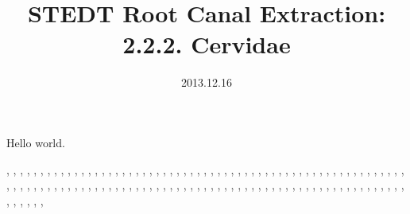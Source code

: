 \documentclass[11pt,twoside,twocolumn]{book}
\title{STEDT Root Canal Extraction:\\2.2.2. Cervidae}
\author{}
\date{2013.12.16}
\begin{document}
Hello world.

\citealt{AAAM-SSM}, 
\citealt{ABR1985}, 
\citealt{ACH1975}, 
\citealt{ACK-DTE}, 
\citealt{ACK-GTL}, 
\citealt{ACST}, 
\citealt{AH-CSDPN}, 
\citealt{AH-TND}, 
\citealt{AJ-BED}, 
\citealt{AM-NaLaze1}, 
\citealt{Anony1959}, 
\citealt{AO-diss}, 
\citealt{AP-Pwo}, 
\citealt{ARC-GMA}, 
\citealt{ARO1980}, 
\citealt{AS-ABCOC}, 
\citealt{AT-MPB}, 
\citealt{AT-Padam}, 
\citealt{AW-CLGD}, 
\citealt{AW-TBT}, 
\citealt{B-ShrpaHQ}, 
\citealt{BAI1909}, 
\citealt{BAI1911}, 
\citealt{BB-Belhare}, 
\citealt{BBL-TL}, 
\citealt{BDHH1971}, 
\citealt{BER1965}, 
\citealt{Bhat-Boro}, 
\citealt{Bhat-TNL}, 
\citealt{Bhat-TNV}, 
\citealt{BK-AD}, 
\citealt{BLBC-Khonom}, 
\citealt{BM-Bah}, 
\citealt{BM-Bbp}, 
\citealt{BM-Hay}, 
\citealt{BM-Hbp}, 
\citealt{BM-Htvm}, 
\citealt{BM-LH}, 
\citealt{BM-Lim}, 
\citealt{BM-PK7}, 
\citealt{BM-PTNL}, 
\citealt{BMMM-Bbp}, 
\citealt{BON1930-31}, 
\citealt{BOR-Sema}, 
\citealt{BOR1938}, 
\citealt{BP-PPWL}, 
\citealt{BRO1837}, 
\citealt{BRO1920}, 
\citealt{BRO1951}, 
\citealt{BRTMCM}, 
\citealt{BS1971b}, 
\citealt{BS1971c}, 
\citealt{BSCH1971a}, 
\citealt{BSCH1971c}, 
\citealt{BSTL}, 
\citealt{BUT1875}, 
\citealt{CAU1969}, 
\citealt{CB-SpitiQ}, 
\citealt{CG-Diss}, 
\citealt{CG-Dolak}, 
\citealt{CG-Kath}, 
\citealt{CG-NewariQ2}, 
\citealt{CG-NewariQ3}, 
\citealt{CHE1990}, 
\citealt{CHU1867}, 
\citealt{CK-CS}, 
\citealt{CK-pGd}, 
\citealt{CK-TujBQ}, 
\citealt{CK-TujMQ}, 
\citealt{CK-YiQ}, 
\citealt{CLA1911}, 
\citealt{COO}, 
\citealt{CSL-YIzd}, 
\citealt{CYS-Meithei}, 
\citealt{DAP-Chm}, 
\citealt{DAS-TED}, 
\citealt{DB-Bisu}, 
\citealt{DB-Lahu}, 
\citealt{DB-Lisu}, 
\citealt{DB-Ph}, 
\citealt{DB-Phunoi}, 
\citealt{DB-PLolo}, 
\citealt{DB-Ugong}, 
\citealt{DBS-PaO}, 
\citealt{DC-Kucong}, 
\citealt{Dell-Bai}, 
\citealt{Deuri}, 
\citealt{DHFRL}, 
\citealt{DHR-IBWS}, 
\citealt{DK-Moyon}, 
\citealt{DLF-Gazhuo}, 
\citealt{DM-BoroQan}, 
\citealt{DM-BoroQno}, 
\citealt{DM-GaroQan}, 
\citealt{DM-GaroQno}, 
\citealt{DM-KQan}, 
\citealt{DM-KQno}, 
\citealt{DM-TKQan}, 
\citealt{DM-TKQno}, 
\citealt{DNW-Gloss}, 
\citealt{DNW-KhamQ}, 
\citealt{DQ-AL}, 
\citealt{DQ-Amdo}, 
\citealt{DQ-Bai}, 
\citealt{DQ-Batang}, 
\citealt{DQ-Bola}, 
\citealt{DQ-Dafang}, 
\citealt{DQ-Daofu}, 
\citealt{DQ-Gazhuo}, 
\citealt{DQ-Hani}, 
\citealt{DQ-Haoni}, 
\citealt{DQ-Jiarong}, 
\citealt{DQ-JinA}, 
\citealt{DQ-JinB}, 
\citealt{DQ-Jingpho}, 
\citealt{DQ-KarenA}, 
\citealt{DQ-KarenB}, 
\citealt{DQ-Langsu}, 
\citealt{DQ-Lashi}, 
\citealt{DQ-Lolopho}, 
\citealt{DQ-Naxi}, 
\citealt{DQ-Nusu}, 
\citealt{DQ-NusuA}, 
\citealt{DQ-NusuB}, 
\end{document}
